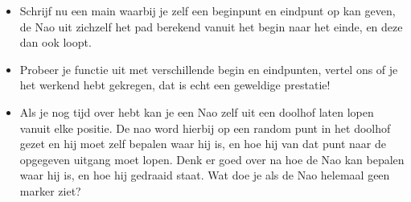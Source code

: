 \documentclass[a4paper]{article}
\begin{document}
\begin{Exercise}
\begin{itemize}
\item Schrijf nu een main waarbij je zelf een beginpunt en eindpunt op kan geven, de Nao uit zichzelf het pad berekend vanuit het begin naar het einde, en deze dan ook loopt.
\item Probeer je functie uit met verschillende begin en eindpunten, vertel ons of je het werkend hebt gekregen, dat is echt een geweldige prestatie!
\item Als je nog tijd over hebt kan je een Nao zelf uit een doolhof laten lopen vanuit elke positie. De nao word hierbij op een random punt in het doolhof gezet en hij moet zelf bepalen waar hij is, en hoe hij van dat punt naar de opgegeven uitgang moet lopen. Denk er goed over na hoe de Nao kan bepalen waar hij is, en hoe hij gedraaid staat. Wat doe je als de Nao helemaal geen marker ziet?
\end{itemize}
\end{Exercise}
\vspace{10 mm}
\end{document}

